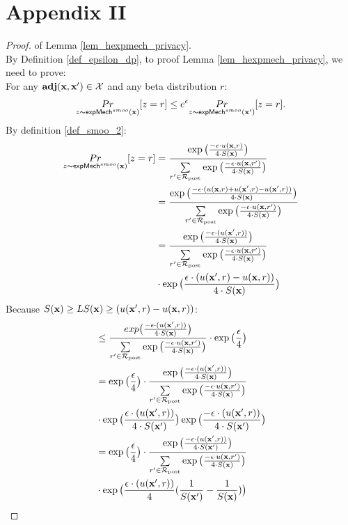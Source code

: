 \documentclass{article}
\begin{document}
\section*{Appendix II}
\label{app_privacyproof}
\begin{proof} of Lemma \ref{lem_hexpmech_privacy}.\\
  By Definition \ref{def_epsilon_dp}, to proof Lemma \ref{lem_hexpmech_privacy}, we need to prove:\\
  For any $\textbf{adj}(\textbf{x},\textbf{x}') \in \mathcal{X}$ and any beta distribution $r$:
  \begin{equation*}
  \underset{z \thicksim \mathsf{expMech}^{smoo}(\textbf{x})}{Pr}[z = r] \leq e^{\epsilon} \underset{z \thicksim \mathsf{expMech}^{smoo}(\textbf{x}')}{Pr}[z = r]. 
  \end{equation*}
  By definition \ref{def_smoo_2}:
  \begin{equation*}
  \begin{split}
  \underset{z \thicksim \mathsf{expMech}^{smoo}(\textbf{x})}{Pr}[z = r] 
  & = \frac {\exp\big(\frac{-\epsilon\cdot u(\textbf{x}, {r})}{4\cdot S(\textbf{x})}\big)}{\sum\limits_{r'\in \mathcal{R}_{\textup{post}}} \exp \big(\frac{-\epsilon\cdot u(\textbf{x}, r')}{4 \cdot S(\textbf{x})}\big)} \\
  & = \frac {\exp\big(
  \frac{-\epsilon\cdot(u(\textbf{x}, {r}) + u(\textbf{x}', {r}) - u(\textbf{x}', {r}))}{4\cdot S(\textbf{x})}
  \big)}
  {\sum\limits_{r'\in \mathcal{R}_{\textup{post}}} \exp \big(\frac{-\epsilon\cdot u(\textbf{x}, r')}{4 \cdot S(\textbf{x})}\big)} \\
  & = \frac {\exp\big(
  \frac{-\epsilon\cdot(u(\textbf{x}', {r}))}{4\cdot S(\textbf{x})}
  \big)}
  {\sum\limits_{r'\in \mathcal{R}_{\textup{post}}} \exp \big(\frac{-\epsilon\cdot u(\textbf{x}, r')}{4 \cdot S(\textbf{x})}\big)}
  \\
  & \cdot \exp\big( \frac{\epsilon\cdot(u(\textbf{x}', {r}) - u(\textbf{x}, {r}))}{4\cdot S(\textbf{x})} \big)\\
  \end{split}
  \end{equation*}
  Because $S(\textbf{x}) \geq LS(\textbf{x}) \geq (u(\textbf{x}', {r}) - u(\textbf{x}, {r}))$:
  \begin{equation*}
  \begin{split}
  & \leq \frac {exp\big(
  \frac{-\epsilon\cdot(u(\textbf{x}', {r}))}{4\cdot S(\textbf{x})}
  \big)}
  {\sum\limits_{r'\in \mathcal{R}_{\textup{post}}} \exp \big(\frac{-\epsilon\cdot u(\textbf{x}, r')}{4 \cdot S(\textbf{x})}\big)}
  \cdot \exp\big( \frac{\epsilon}{4} \big) \\
  & = \exp\big( \frac{\epsilon}{4} \big) \cdot 
  \frac {
  \exp
  \big(
  \frac{-\epsilon\cdot(u(\textbf{x}', {r}))}{4\cdot S(\textbf{x})}
  \big)
  } 
  {\sum\limits_{r'\in \mathcal{R}_{\textup{post}}} \exp \big(\frac{-\epsilon\cdot u(\textbf{x}, r')}{4 \cdot S(\textbf{x})}\big)}\\
  & \cdot \exp
  \big(
  \frac{\epsilon\cdot(u(\textbf{x}', {r}))}{4\cdot S(\textbf{x}')}
  \big)
  \exp
  \big(
  \frac{-\epsilon\cdot(u(\textbf{x}', {r}))}{4\cdot S(\textbf{x}')}
  \big)\\
  & = \exp\big( \frac{\epsilon}{4} \big) \cdot 
  \frac {
  \exp
  \big(
  \frac{-\epsilon\cdot(u(\textbf{x}', {r}))}{4\cdot S(\textbf{x}')}
  \big)
  } 
  {\sum\limits_{r'\in \mathcal{R}_{\textup{post}}} \exp \big(\frac{-\epsilon\cdot u(\textbf{x}, r')}{4 \cdot S(\textbf{x})}\big)}\\
  & \cdot \exp
  \big(
  \frac{\epsilon\cdot(u(\textbf{x}', {r}))}{4}(\frac{1}{S(\textbf{x}')} - \frac{1}{S(\textbf{x})})
  \big)\\
  \end{split}
  \end{equation*}
  

\end{proof}
\end{document}

